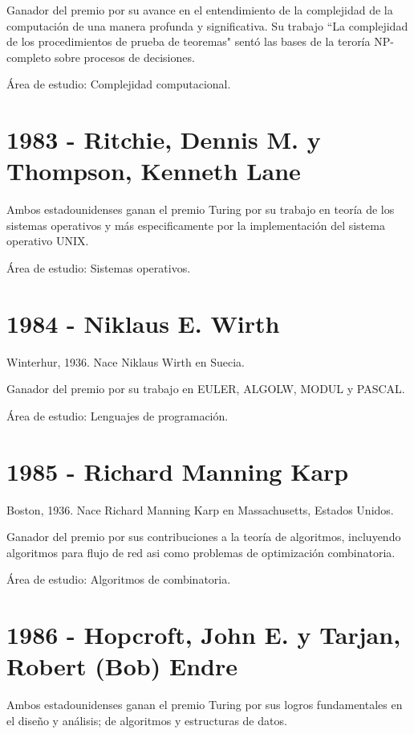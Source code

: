 \documentclass[notitlepage,letterpaper, 11pt]{article}
\begin{document}
\noindent Ganador del premio por su avance en el entendimiento de la complejidad de la computación de una manera profunda y significativa. Su trabajo ``La complejidad de los procedimientos de prueba de teoremas" sentó las bases de la teroría NP-completo sobre procesos de decisiones.

\noindent Área de estudio: Complejidad computacional.
\newline

\section*{1983 - Ritchie, Dennis M. y Thompson, Kenneth Lane}
\noindent Ambos estadounidenses ganan el premio Turing por su trabajo en teoría de los sistemas operativos y más especificamente por la implementación del sistema operativo UNIX.

\noindent Área de estudio: Sistemas operativos.
\newline

\section*{1984 - Niklaus E. Wirth}
\noindent Winterhur, 1936. Nace Niklaus Wirth en Suecia.

\noindent Ganador del premio por su trabajo en EULER, ALGOLW, MODUL y PASCAL.

\noindent Área de estudio: Lenguajes de programación.
\newline

\section*{1985 - Richard Manning Karp}
\noindent Boston, 1936. Nace Richard Manning Karp en Massachusetts, Estados Unidos.

\noindent Ganador del premio por sus contribuciones a la teoría de algoritmos, incluyendo algoritmos para flujo de red asi como problemas de optimización combinatoria.

\noindent Área de estudio: Algoritmos de combinatoria.
\newline

\section*{1986 - Hopcroft, John E. y Tarjan, Robert (Bob) Endre}
\noindent Ambos estadounidenses ganan el premio Turing por sus logros fundamentales en el diseño y análisis; de algoritmos y estructuras de datos.
\end{document}
